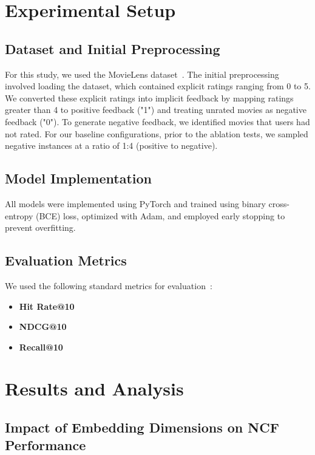 \documentclass[runningheads]{llncs}
\begin{document}
\section{Experimental Setup}

\subsection{Dataset and Initial Preprocessing}
For this study, we used the MovieLens dataset~\cite{harper2015movielens}. The initial preprocessing involved loading the dataset, which contained explicit ratings ranging from 0 to 5. We converted these explicit ratings into implicit feedback by mapping ratings greater than 4 to positive feedback ("1") and treating unrated movies as negative feedback ("0"). To generate negative feedback, we identified movies that users had not rated. For our baseline configurations, prior to the ablation tests, we sampled negative instances at a ratio of 1:4 (positive to negative).

\subsection{Model Implementation}
All models were implemented using PyTorch and trained using binary cross-entropy (BCE) loss, optimized with Adam, and employed early stopping to prevent overfitting.

\subsection{Evaluation Metrics}
We used the following standard metrics for evaluation~\cite{he2020lightgcn}:

\begin{itemize}
    \item \textbf{Hit Rate@10}
    \item \textbf{NDCG@10}
    \item \textbf{Recall@10}
\end{itemize}

\section{Results and Analysis}

\subsection{Impact of Embedding Dimensions on NCF Performance}
\end{document}
